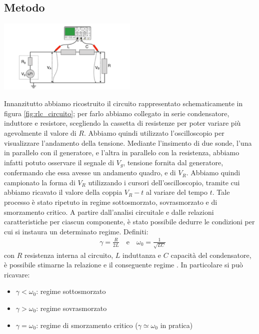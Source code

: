 \documentclass[a4paper]{article}
\begin{document}
\subsection{Metodo}
\begin{center}
	\includegraphics[width=0.5\textwidth]{grafici/circuito-rlc.png}
	\label{fig:rlc_circuito} %
\end{center}
Innanzitutto abbiamo ricostruito il circuito rappresentato schematicamente in figura \ref{fig:rlc_circuito}; per farlo abbiamo collegato in serie condensatore, induttore e resistore, scegliendo la cassetta di resistenze per poter variare più agevolmente il valore di $R$. Abbiamo quindi utilizzato l'oscilloscopio per visualizzare l'andamento della tensione. Mediante l'insimento di due sonde, l'una in parallelo con il generatore, e l'altra in parallelo con la resistenza, abbiamo infatti potuto osservare il segnale di $V_g$, tensione fornita dal generatore, confermando che essa avesse un andamento quadro, e di $V_R$. Abbiamo quindi campionato la forma di $V_R$ utilizzando i cursori dell'oscilloscopio, tramite cui abbiamo ricavato il valore della coppia $V_R-t$ al variare del tempo $t$. Tale processo è stato ripetuto in regime sottosmorzato, sovrasmorzato e di smorzamento critico. A partire dall'analisi circuitale e dalle relazioni caratteristiche per ciascun componente, è stato possibile dedurre le condizioni per cui si instaura un determinato regime. Definiti:
\begin{align}
	 & \gamma = \frac {R}{2L} \quad \text{e} \quad \omega_0 = \frac {1}{\sqrt{LC}} \label{eq:rlc_params} %
\end{align}
con $R$ resistenza interna al circuito, $L$ induttanza e $C$ capacità del condensatore, è possibile stimarne la relazione e il conseguente regime .
In particolare si può ricavare:
\begin{itemize}
	\item \( \mathit{\gamma < \omega_0} \): regime sottosmorzato
	\item \( \mathit{\gamma > \omega_0} \): regime sovrasmorzato
	\item \( \mathit{\gamma = \omega_0} \): regime di smorzamento critico ($\gamma \simeq \omega_0$ in pratica)
\end{itemize}
\end{document}
